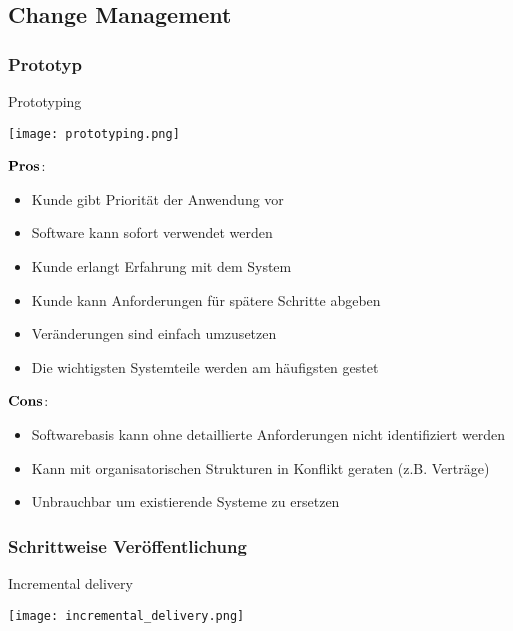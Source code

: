 \subsection{Change Management}
\subsubsection{Prototyp}
\begin{table}[H]
\caption{Prototyping}
\texttt{[image: prototyping.png]}
\end{table}
\begin{multicols}{2}
$\bold{Pros}$:
\begin{itemize}
	\item Kunde gibt Priorität der Anwendung vor
	\item Software kann sofort verwendet werden
	\item Kunde erlangt Erfahrung mit dem System
	\item Kunde kann Anforderungen für spätere Schritte abgeben
	\item Veränderungen sind einfach umzusetzen
	\item Die wichtigsten Systemteile werden am häufigsten gestet 
\end{itemize}
\columnbreak
$\bold{Cons}$:
\begin{itemize}
	\item Softwarebasis kann ohne detaillierte Anforderungen nicht identifiziert werden
	\item Kann mit organisatorischen Strukturen in Konflikt geraten (z.B. Verträge)
	\item Unbrauchbar um existierende Systeme zu ersetzen
\end{itemize}
\end{multicols}
\subsubsection{Schrittweise Veröffentlichung}
\begin{table}[H]
\caption{Incremental delivery}
\texttt{[image: incremental\_delivery.png]}
\end{table}

























